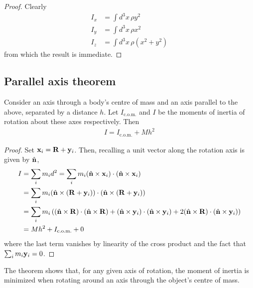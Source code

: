 \documentclass{../template/note}
\begin{document}
    \begin{proof}
        Clearly
        \begin{align*}
            I_x &= \int d^3 x \, \rho y^2 \\
            I_y &= \int d^3 x \, \rho x^2 \\
            I_z &= \int d^3 x \, \rho(x^2+y^2)
        \end{align*}
        from which the result is immediate.
    \end{proof}
    
    \subsection{Parallel axis theorem}
    
    \begin{proposition}
        Consider an axis through a body's centre of mass and an axis parallel to the above, separated by a distance \(h\). Let \(I_\text{c.o.m.}\) and \(I\) be the moments of inertia of rotation about these axes respectively. Then
        \begin{align*}
            I = I_\text{c.o.m.} + Mh^2
        \end{align*}
    \end{proposition}
    
    \begin{proof}
        Set \(\V x_i = \V R + \V y_i\). Then, recalling a unit vector along the rotation axis is given by \(\hvec n\),
        \begin{align*}
            I &= \sum_i m_i d^2 = \sum_i m_i (\hvec n \times \V x_i) \cdot (\hvec n \times \V x_i) \\
            &= \sum_i m_i (\hvec n \times (\V R + \V y_i)) \cdot (\hvec n \times (\V R + \V y_i)) \\
            &= \sum_i m_i \left((\hvec n \times \V R) \cdot (\hvec n \times \V R) + (\hvec n \times \V y_i) \cdot (\hvec n \times \V y_i) + 2(\hvec n \times \V R) \cdot (\hvec n \times \V y_i)\right) \\
            &= Mh^2 + I_{\text{c.o.m.}} + 0
        \end{align*}
        where the last term vanishes by linearity of the cross product and the fact that \(\sum_i m_i \V y_i = 0\).        
    \end{proof}
    
    \begin{remark*}
        The theorem shows that, for any given axis of rotation, the moment of inertia is minimized when rotating around an axis through the object's centre of mass.
    \end{remark*}
    
\end{document}
